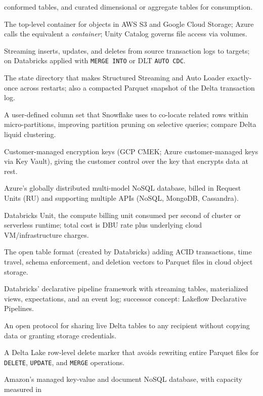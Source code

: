 \begin{description}
    conformed tables, and curated dimensional or aggregate tables for consumption.
  \item[Bucket (storage)] The top-level container for objects in AWS S3 and Google Cloud Storage;
    Azure calls the equivalent a \emph{container}; Unity Catalog governs file access via volumes.
  \item[Change Data Capture (CDC)] Streaming inserts, updates, and deletes from source transaction
    logs to targets; on Databricks applied with \texttt{MERGE INTO} or DLT \texttt{AUTO CDC}.
  \item[Checkpoint] The state directory that makes Structured Streaming and Auto Loader exactly-once
    across restarts; also a compacted Parquet snapshot of the Delta transaction log.
  \item[Clustering key] A user-defined column set that Snowflake uses to co-locate related rows within
    micro-partitions, improving partition pruning on selective queries; compare Delta liquid clustering.
  \item[CMEK / CMK] Customer-managed encryption keys (GCP CMEK; Azure customer-managed keys via Key
    Vault), giving the customer control over the key that encrypts data at rest.
  \item[Cosmos DB] Azure's globally distributed multi-model NoSQL database, billed in Request Units
    (RU) and supporting multiple APIs (NoSQL, MongoDB, Cassandra).
  \item[DBU] Databricks Unit, the compute billing unit consumed per second of cluster or serverless
    runtime; total cost is DBU rate plus underlying cloud VM/infrastructure charges.
  \item[Delta Lake] The open table format (created by Databricks) adding ACID transactions, time
    travel, schema enforcement, and deletion vectors to Parquet files in cloud object storage.
  \item[Delta Live Tables (DLT)] Databricks' declarative pipeline framework with streaming tables,
    materialized views, expectations, and an event log; successor concept: Lakeflow Declarative Pipelines.
  \item[Delta Sharing] An open protocol for sharing live Delta tables to any recipient without
    copying data or granting storage credentials.
  \item[Deletion vector] A Delta Lake row-level delete marker that avoids rewriting entire Parquet
    files for \texttt{DELETE}, \texttt{UPDATE}, and \texttt{MERGE} operations.
  \item[DynamoDB] Amazon's managed key-value and document NoSQL database, with capacity measured in

\end{description}
